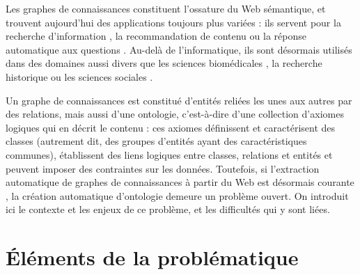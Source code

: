 \label{sec:Introduction}  %

Les graphes de connaissances constituent l'ossature du Web sémantique, et trouvent aujourd'hui des applications toujours plus variées : ils servent pour la recherche d'information \cite{bounhas2019building, dietz2018utilizing}, la recommandation de contenu \cite{ying2018graph, wang2018ripplenet, wang2019explainable} ou la réponse automatique aux questions \cite{zhang2018variational, lukovnikov2017neural, saha2018complex}.  %
Au-delà de l'informatique, ils sont désormais utilisés dans des domaines aussi divers que les sciences biomédicales \cite{bakal2018exploiting, sousa2020evolving}, la recherche historique \cite{hyvonen2019knowledge, wilcke2017user} ou les sciences sociales \cite{heling2019building}.

%
Un graphe de connaissances est constitué d'entités reliées les unes aux autres par des relations, mais aussi d'une ontologie, c'est-à-dire d'une collection d'axiomes logiques qui en décrit le contenu : ces axiomes définissent et caractérisent des classes (autrement dit, des groupes d'entités ayant des caractéristiques communes),  établissent des liens logiques entre classes, relations et entités et peuvent imposer des contraintes sur les données. Toutefois, si l'extraction automatique de graphes de connaissances à partir du Web est désormais courante \cite{auer2007dbpedia}, la création automatique d'ontologie demeure un problème ouvert. On introduit ici le contexte et les enjeux de ce problème, et les difficultés qui y sont liées.


\section{Éléments de la problématique}  %


